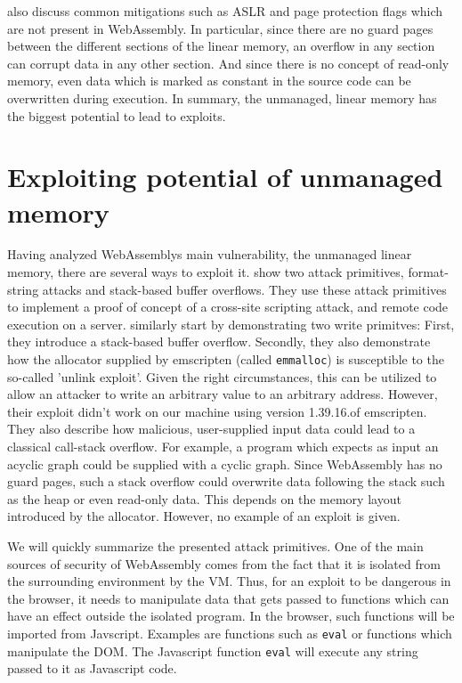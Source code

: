 \documentclass[sigconf]{acmart}
\begin{document}
\citet{lehmann_everything_2020} also discuss common mitigations such as ASLR and page protection flags which are not present in WebAssembly. In particular, since there are no guard pages between the different sections of the linear memory, an overflow in any section can corrupt data in any other section. And since there is no concept of read-only memory, even data which is marked as constant in the source code can be overwritten during execution. In summary, the unmanaged, linear memory has the biggest potential to lead to exploits.

\section{Exploiting potential of unmanaged memory}
Having analyzed WebAssemblys main vulnerability, the unmanaged linear memory, there are several ways to exploit it. \citet{mcfadden_security_2018} show two attack primitives, format-string attacks and stack-based buffer overflows. They use these attack primitives to implement a proof of concept of a cross-site scripting attack, and remote code execution on a server.
\citet{lehmann_everything_2020} similarly start by demonstrating two write primitves: First, they introduce a stack-based buffer overflow. Secondly, they also demonstrate how the allocator supplied by emscripten (called \texttt{emmalloc}) is susceptible to the so-called 'unlink exploit'. Given the right circumstances, this can be utilized to allow an attacker to write an arbitrary value to an arbitrary address. However, their exploit didn't work on our machine using version 1.39.16.of emscripten. They also describe how malicious, user-supplied input data could lead to a classical call-stack overflow. For example, a program which expects as input an acyclic graph could be supplied with a cyclic graph. Since WebAssembly has no guard pages, such a stack overflow could overwrite data following the stack such as the heap or even read-only data. This depends on the memory layout introduced by the allocator. However, no example of an exploit is given. 

We will quickly summarize the presented attack primitives. One of the main sources of security of WebAssembly comes from the fact that it is isolated from the surrounding environment by the VM. Thus, for an exploit to be dangerous in the browser, it needs to manipulate data that gets passed to functions which can have an effect outside the isolated program. In the browser, such functions will be imported from Javscript. Examples are functions such as \texttt{eval} or functions which manipulate the DOM.
The Javascript function \texttt{eval} will execute any string passed to it as Javascript code. 
\end{document}
